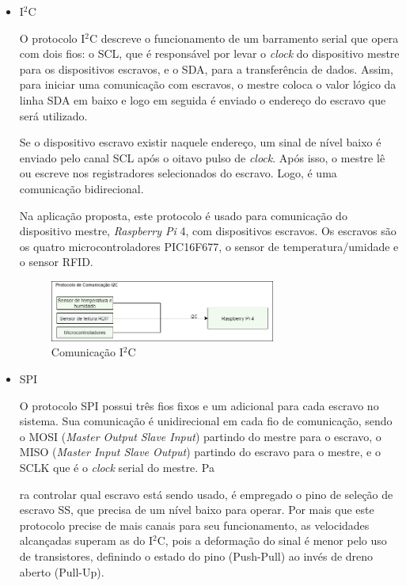 \begin{itemize}
    \item I$^2$C
    
    O protocolo I$^2$C descreve o funcionamento de um barramento serial que opera com dois fios: o SCL, que é responsável por levar o \textit{clock} do dispositivo mestre para os dispositivos escravos, e o SDA, para a transferência de dados. Assim, para iniciar uma comunicação com escravos, o mestre coloca o valor lógico da linha SDA em baixo e logo em seguida é enviado o endereço do escravo que será utilizado. 
    
    Se o dispositivo escravo existir naquele endereço, um sinal de nível baixo é enviado pelo canal SCL após o oitavo pulso de \textit{clock}. Após isso, o mestre lê ou escreve nos registradores selecionados do escravo. Logo, é uma comunicação bidirecional. 
    
    Na aplicação proposta, este protocolo é usado para comunicação do dispositivo mestre, \textit{Raspberry Pi} 4, com dispositivos escravos. Os escravos são os quatro microcontroladores PIC16F677, o sensor de temperatura/umidade e o sensor RFID.
    
    \begin{figure}[H]
    \centering
    \includegraphics[width=0.7\textwidth]{figuras/eletronica/fluxogramas/comunicacao_i2c.png}
    \caption{Comunicação I$^2$C}
    \label{fig:PC_i2c}
\end{figure}
    
    \item SPI
    
    O protocolo SPI possui três fios fixos e um adicional para cada escravo no sistema. Sua comunicação é unidirecional em cada fio de comunicação, sendo o MOSI (\textit{Master Output Slave Input}) partindo do mestre para o escravo, o MISO (\textit{Master Input Slave Output}) partindo do escravo para o mestre, e o SCLK que é o \textit{clock} serial do mestre. Pa
    
    ra controlar qual escravo está sendo usado, é empregado o pino de seleção de escravo SS, que precisa de um nível baixo para operar. Por mais que este protocolo precise de mais canais para seu funcionamento, as velocidades alcançadas  superam as do I$^2$C, pois a deformação do sinal é menor pelo uso de transistores, definindo o estado do pino (Push-Pull) ao invés de dreno aberto (Pull-Up).
    

\end{itemize}
